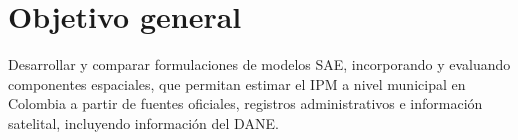 

\label{sec:objetivos}

\section{Objetivo general}

Desarrollar y comparar formulaciones de modelos SAE, incorporando y evaluando componentes espaciales, que permitan estimar el IPM a nivel municipal en Colombia a partir de fuentes oficiales, registros administrativos e información satelital, incluyendo información del DANE.